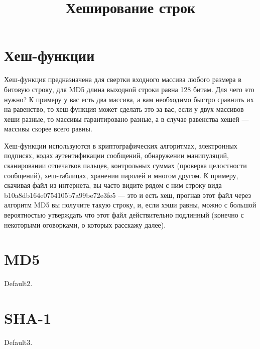 \documentclass[a4paper, 12pt, oneside]{scrartcl}
\title{Хеширование строк}
\author{}
\date{}
\begin{document}
    \maketitle
    \section{Хеш-функции}\label{sec:section1}
   Хеш-функция предназначена для свертки входного массива любого размера в битовую строку, для MD5 длина выходной строки равна 128 битам. Для чего это нужно? К примеру у вас есть два массива, а вам необходимо быстро сравнить их на равенство, то хеш-функция может сделать это за вас, если у двух массивов хеши разные, то массивы гарантировано разные, а в случае равенства хешей — массивы скорее всего равны.
   
   Хеш-функции используются в криптографических алгоритмах, электронных подписях, кодах аутентификации сообщений, обнаружении манипуляций, сканировании отпечатков пальцев, контрольных суммах (проверка целостности сообщений), хеш-таблицах, хранении паролей и многом другом. К примеру, скачивая файл из интернета, вы часто видите рядом с ним строку вида b10a8db164e0754105b7a99be72e3fe5 — это и есть хеш, прогнав этот файл через алгоритм MD5 вы получите такую строку, и, если хэши равны, можно с большой вероятностью утверждать что этот файл действительно подлинный (конечно с некоторыми оговорками, о которых расскажу далее).~\cite{managementsystem}

    \section{MD5}\label{sec:section2}
    Default2.
    \section{SHA-1}\label{sec:section3}
    Default3.
    
    
\end{document}
